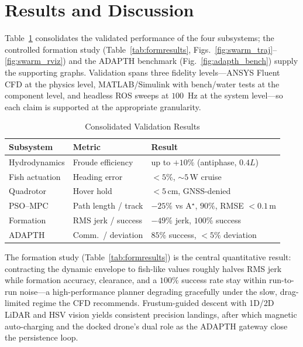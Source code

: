 \documentclass[journal]{IEEEtran}
\begin{document}
\section{Results and Discussion}
\label{sec:results}
Table~\ref{tab:results} consolidates the validated performance of the four
subsystems; the controlled formation study (Table~\ref{tab:formresults},
Figs.~\ref{fig:swarm_traj}--\ref{fig:swarm_rviz}) and the ADAPTH benchmark
(Fig.~\ref{fig:adapth_bench}) supply the supporting graphs. Validation spans three
fidelity levels---ANSYS Fluent CFD at the physics level, MATLAB/Simulink with
bench/water tests at the component level, and headless ROS sweeps at $100$~Hz at the
system level---so each claim is supported at the appropriate granularity.

\begin{table}[!t]
\centering
\caption{Consolidated Validation Results}
\label{tab:results}
\begin{tabular}{p{2.0cm}p{2.0cm}p{2.6cm}}
\toprule
Subsystem & Metric & Result\\
\midrule
Hydrodynamics  & Froude efficiency  & up to $+10\%$ (antiphase, $0.4L$)\\
Fish actuation & Heading error      & $<5\%$, $\sim\!5$\,W cruise\\
Quadrotor      & Hover hold         & $<5$\,cm, GNSS-denied\\
PSO--MPC        & Path length / track& $-25\%$ vs A$^\star$, $90\%$, RMSE $<0.1$\,m\\
Formation      & RMS jerk / success & $-49\%$ jerk, $100\%$ success\\
ADAPTH         & Comm.\ / deviation & $85\%$ success, $<5\%$ deviation\\
\bottomrule
\end{tabular}
\end{table}

The formation study (Table~\ref{tab:formresults}) is the central quantitative
result: contracting the dynamic envelope to fish-like values roughly halves RMS
jerk while formation accuracy, clearance, and a $100\%$ success rate stay within
run-to-run noise---a high-performance planner degrading gracefully under the slow,
drag-limited regime the CFD recommends. Frustum-guided descent with 1D/2D LiDAR and
HSV vision yields consistent precision landings, after which magnetic auto-charging
and the docked drone's dual role as the ADAPTH gateway close the persistence loop.
\end{document}

